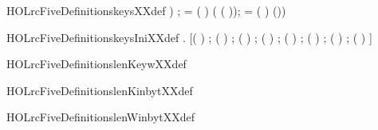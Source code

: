 \begin{SaveVerbatim}{HOLrcFiveDefinitionskeysXXdef}
                    ) ;
         = ( \HOLSymConst{\ensuremath{+}} )  ( \HOLSymConst{\HOLTokenProd{}} ( \HOLSymConst{\ensuremath{+}} ));
         = ( \HOLSymConst{\ensuremath{+}} )  
        (\HOLSymConst{,}\HOLSymConst{,}\HOLSymConst{,}\HOLSymConst{,}\HOLSymConst{,}))
\end{SaveVerbatim}
\newcommand{\HOLrcFiveDefinitionskeysXXdef}{\UseVerbatim{HOLrcFiveDefinitionskeysXXdef}}
\begin{SaveVerbatim}{HOLrcFiveDefinitionskeysIniXXdef}
\HOLTokenTurnstile{} \HOLSymConst{\HOLTokenForall{}}.   \HOLSymConst{=}
       [( \HOLSymConst{\HOLTokenExtract{}} ) ; ( \HOLSymConst{\HOLTokenExtract{}} ) ; ( \HOLSymConst{\HOLTokenExtract{}} ) ; ( \HOLSymConst{\HOLTokenExtract{}} ) ;
        ( \HOLSymConst{\HOLTokenExtract{}} ) ; ( \HOLSymConst{\HOLTokenExtract{}} ) ; ( \HOLSymConst{\HOLTokenExtract{}} ) ; ( \HOLSymConst{\HOLTokenExtract{}} ) ]
\end{SaveVerbatim}
\newcommand{\HOLrcFiveDefinitionskeysIniXXdef}{\UseVerbatim{HOLrcFiveDefinitionskeysIniXXdef}}
\begin{SaveVerbatim}{HOLrcFiveDefinitionslenKeywXXdef}
\HOLTokenTurnstile{}  \HOLSymConst{=} 
\end{SaveVerbatim}
\newcommand{\HOLrcFiveDefinitionslenKeywXXdef}{\UseVerbatim{HOLrcFiveDefinitionslenKeywXXdef}}
\begin{SaveVerbatim}{HOLrcFiveDefinitionslenKinbytXXdef}
\HOLTokenTurnstile{}  \HOLSymConst{=} 
\end{SaveVerbatim}
\newcommand{\HOLrcFiveDefinitionslenKinbytXXdef}{\UseVerbatim{HOLrcFiveDefinitionslenKinbytXXdef}}
\begin{SaveVerbatim}{HOLrcFiveDefinitionslenWinbytXXdef}
\HOLTokenTurnstile{}  \HOLSymConst{=} 
\end{SaveVerbatim}
